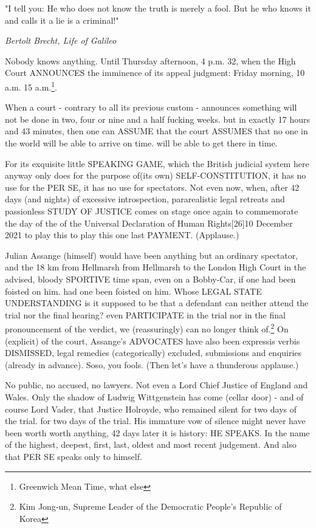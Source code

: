 \begin{multicols}{2}
\epigraph{"I tell you: He who does not know the truth is merely a fool. But he who knows it and calls it a lie is a criminal!"}{\textit{Bertolt Brecht, Life of Galileo}}

Nobody knows anything. Until Thursday afternoon, 4 p.m. 32, when the High Court ANNOUNCES the
imminence of its appeal judgment: Friday morning, 10 a.m. 15 a.m.\footnote[25]{Greenwich Mean
Time, what else}.

When a court - contrary to all its previous custom - announces something will not be done in two,
four or nine and a half fucking weeks. but in exactly 17 hours and 43 minutes, then one can ASSUME
that the court ASSUMES that no one in the world will be able to arrive on time. will be able to get
there in time.

For its exquisite little SPEAKING GAME, which the British judicial system here anyway only does for
the purpose of(its own) SELF-CONSTITUTION, it has no use for the PER SE, it has no use for
spectators. Not even now, when, after 42 days (and nights) of excessive introspection,
pararealistic legal retreats and passionless STUDY OF JUSTICE comes on stage once again to
commemorate the day of the of the Universal Declaration of Human Rights[26]{10 December 2021} to
play this to play this one last PAYMENT. (Applause.)

Julian Assange (himself) would have been anything but an ordinary spectator, and the 18 km from
Hellmarsh from Hellmarsh to the London High Court in the advised, bloody SPORTIVE time span, even
on a Bobby-Car, if one had been foisted on him. had one been foisted on him. Whose LEGAL STATE
UNDERSTANDING is it supposed to be that a defendant can neither attend the trial nor the final
hearing? even PARTICIPATE in the trial nor in the final pronouncement of the verdict, we
(reassuringly) can no longer think of.\footnote[27]{Kim Jong-un, Supreme Leader of the Democratic
People's Republic of Korea} On (explicit) of the court, Assange's ADVOCATES have also been
expressis verbis DISMISSED, legal remedies (categorically) excluded, submissions and enquiries
(already in advance). Soso, you fools. (Then let's have a thunderous applause.)

No public, no accused, no lawyers. Not even a Lord Chief Justice of England and Wales. Only the
shadow of Ludwig Wittgenstein has come (cellar door) - and of course Lord Vader, that Justice
Holroyde, who remained silent for two days of the trial. for two days of the trial. His immature
vow of silence might never have been worth worth anything, 42 days later it is history: HE SPEAKS.
In the name of the highest, deepest, first, last, oldest and most recent judgement. And also that
PER SE speaks only to himself.



\end{multicols}
